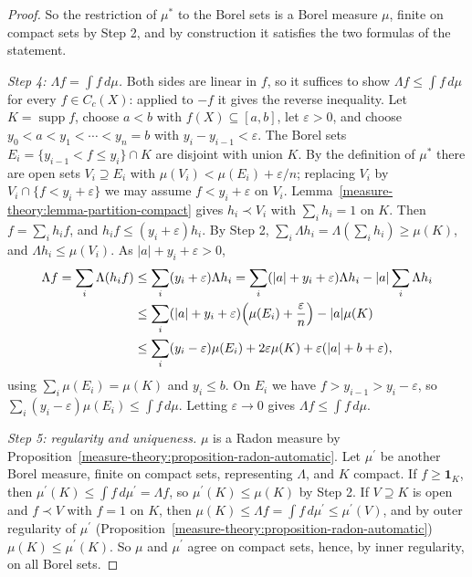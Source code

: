 \begin{proof}
So the restriction of $\mu^*$ to the Borel sets is a Borel measure $\mu$, finite on compact sets by Step 2, and by construction it satisfies the two formulas of the statement.

\emph{Step 4: $\Lambda f = \int f\,d\mu$.} Both sides are linear in $f$, so it suffices to show $\Lambda f \leq \int f\,d\mu$ for every $f \in C_c(X)$: applied to $-f$ it gives the reverse inequality.
Let $K = \operatorname{supp}f$, choose $a < b$ with $f(X) \subseteq [a, b]$, let $\varepsilon > 0$, and choose $y_0 < a < y_1 < \cdots < y_n = b$ with $y_i - y_{i-1} < \varepsilon$. The Borel sets
$E_i = \{y_{i-1} < f \leq y_i\} \cap K$ are disjoint with union $K$. By the definition of $\mu^*$ there are open sets $V_i \supseteq E_i$ with $\mu(V_i) < \mu(E_i) + \varepsilon/n$; replacing $V_i$ by
$V_i \cap \{f < y_i + \varepsilon\}$ we may assume $f < y_i + \varepsilon$ on $V_i$. Lemma~\ref{measure-theory:lemma-partition-compact} gives $h_i \prec V_i$ with $\sum_ih_i = 1$ on $K$. Then
$f = \sum_ih_if$, and $h_if \leq (y_i + \varepsilon)h_i$. By Step 2, $\sum_i\Lambda h_i = \Lambda(\sum_ih_i) \geq \mu(K)$, and $\Lambda h_i \leq \mu(V_i)$. As $|a| + y_i + \varepsilon > 0$,
\[
\begin{aligned}
\Lambda f = \sum_i\Lambda(h_if) &\leq \sum_i(y_i + \varepsilon)\Lambda h_i = \sum_i(|a| + y_i + \varepsilon)\Lambda h_i - |a|\sum_i\Lambda h_i\\
&\leq \sum_i(|a| + y_i + \varepsilon)\Bigl(\mu(E_i) + \frac{\varepsilon}{n}\Bigr) - |a|\mu(K)\\
&\leq \sum_i(y_i - \varepsilon)\mu(E_i) + 2\varepsilon\mu(K) + \varepsilon(|a| + b + \varepsilon),
\end{aligned}
\]
using $\sum_i\mu(E_i) = \mu(K)$ and $y_i \leq b$. On $E_i$ we have $f > y_{i-1} > y_i - \varepsilon$, so $\sum_i(y_i - \varepsilon)\mu(E_i) \leq \int f\,d\mu$. Letting $\varepsilon \to 0$ gives
$\Lambda f \leq \int f\,d\mu$.

\emph{Step 5: regularity and uniqueness.} $\mu$ is a Radon measure by Proposition~\ref{measure-theory:proposition-radon-automatic}. Let $\mu^{\prime}$ be another Borel measure, finite on compact sets,
representing $\Lambda$, and $K$ compact. If $f \geq \mathbf{1}_K$, then $\mu^{\prime}(K) \leq \int f\,d\mu^{\prime} = \Lambda f$, so $\mu^{\prime}(K) \leq \mu(K)$ by Step 2. If $V \supseteq K$ is open and
$f \prec V$ with $f = 1$ on $K$, then $\mu(K) \leq \Lambda f = \int f\,d\mu^{\prime} \leq \mu^{\prime}(V)$, and by outer regularity of $\mu^{\prime}$
(Proposition~\ref{measure-theory:proposition-radon-automatic}) $\mu(K) \leq \mu^{\prime}(K)$. So $\mu$ and $\mu^{\prime}$ agree on compact sets, hence, by inner regularity, on all Borel sets.
\end{proof}

